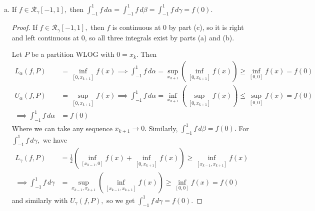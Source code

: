 \documentclass{article}
\begin{document}
\begin{itemize}
\begin{enumerate}[(a)]
\begin{proof}
					$(\impliedby):$ If $f$ is continuous at 0, then given $\varepsilon>0,$ there exists a $\delta>0$ such that $\abs{f(x)-f(0)}<\frac{\varepsilon}{2}$ whenever $\abs{x}<\delta.$ Let $P$ be a partition of $[-1, 1],$ with $0=x_k\in P$ and $-\delta/2=x_{k-1}$ and $\delta/2=x_{k+1}.$ Then $\Delta\gamma_i=\frac{1}{2}$ when $i=k, k+1,$ so
					\begin{align*}
						U(f, P) &= \frac{1}{2}\left(\sup_{[-\delta/2, 0]} f(x) + \sup_{[0, \delta/2]} f(x) \right)\le \sup_{[-\delta/2, \delta/2]}f(x)< f(0) + \frac{\varepsilon}{2} \\
						L(f, P) &= \frac{1}{2}\left(\inf_{[-\delta/2, 0]} f(x) + \inf_{[0, \delta/2]} f(x) \right)\ge \inf_{[-\delta/2, \delta/2]}f(x)> f(0) - \frac{\varepsilon}{2} \\ 
						\implies U(f, P)-L(f, P) &< \left( f(0)+\frac{\varepsilon}{2} \right) - \left( f(0)-\frac{\varepsilon}{2} \right) = \varepsilon
					\end{align*}
					so $f\in\mathcal R_\gamma[-1, 1].$
				\end{proof}

			\item If $f\in\mathcal R_\gamma[-1, 1],$ then $\int_{-1}^1 f\, d\alpha=\int_{-1}^1 f\, d\beta = \int_{-1}^1 f\, d\gamma = f(0).$
				\begin{proof}
					If $f\in\mathcal R_\gamma[-1, 1],$ then $f$ is continuous at 0 by part (c), so it is right and left continuous at 0, so all three integrals exist by parts (a) and (b).

					Let $P$ be a partition WLOG with $0=x_k.$ Then
					\begin{align*}
						L_\alpha (f, P) &= \inf_{[0, x_{k+1}]}f(x) \implies \int_{-1}^1 f\, d\alpha = \sup_{x_{k+1}} \left( \inf_{[0, x_{k+1}]}f(x) \right) \ge \inf_{[0, 0]}f(x) = f(0) \\
						U_\alpha(f, P) &= \sup_{[0, x_{k+1}]}f(x) \implies \int_{-1}^1 f\, d\alpha = \inf_{x_{k+1}} \left( \sup_{[0, x_{k+1}]}f(x) \right) \le \sup_{[0, 0]}f(x) = f(0) \\
						\implies \int_{-1}^1 f\, d\alpha &= f(0)
					\end{align*}
					Where we can take any sequence $x_{k+1}\to 0.$ Similarly, $\int_{-1}^1 f\, d\beta = f(0).$ For $\int_{-1}^1f\, d\gamma,$ we have
					\begin{align*}
						L_\gamma(f, P) &= \frac{1}{2}\left( \inf_{[x_{k-1}, 0]}f(x) + \inf_{[0, x_{k+1}]}f(x) \right) \ge \inf_{[x_{k-1}, x_{k+1}]}f(x) \\ 
						\implies \int_{-1}^1 f\, d\gamma &= \sup_{x_{k-1}, x_{k+1}}\left( \inf_{[x_{k-1}, x_{k+1}]}f(x) \right) \ge \inf_{[0, 0]}f(x) = f(0)
					\end{align*}
					and similarly with $U_\gamma(f, P),$ so we get $\int_{-1}^1 f\, d\gamma=f(0).$
				\end{proof}
				

\end{enumerate}
\end{itemize}
\end{document}

